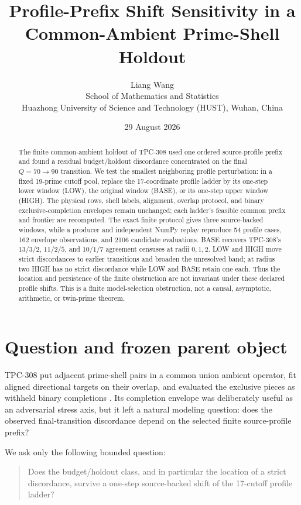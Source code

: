 \documentclass[11pt]{article}
\title{Profile-Prefix Shift Sensitivity in a\\
Common-Ambient Prime-Shell Holdout}
\author{Liang Wang\\
School of Mathematics and Statistics\\
Huazhong University of Science and Technology (HUST), Wuhan, China}
\date{29 August 2026}
\begin{document}
\maketitle

\begin{abstract}
The finite common-ambient holdout of TPC-308 used one ordered source-profile
prefix and found a residual budget/holdout discordance concentrated on the
final $Q=70\to90$ transition.  We test the smallest neighboring profile
perturbation: in a fixed 19-prime cutoff pool, replace the 17-coordinate
profile ladder by its one-step lower window (LOW), the original window (BASE),
or its one-step upper window (HIGH).  The physical rows, shell labels,
alignment, overlap protocol, and binary exclusive-completion envelopes remain
unchanged; each ladder's feasible common prefix and frontier are recomputed.
The exact finite protocol gives three source-backed windows, while a producer
and independent NumPy replay reproduce 54 profile cases, 162 envelope
observations, and 2106 candidate evaluations.  BASE recovers TPC-308's
$13/3/2$, $11/2/5$, and $10/1/7$ agreement censuses at radii $0,1,2$.
LOW and HIGH move strict discordances to earlier transitions and broaden the
unresolved band; at radius two HIGH has no strict discordance while LOW and
BASE retain one each.  Thus the location and persistence of the finite
obstruction are not invariant under these declared profile shifts.  This is a
finite model-selection obstruction, not a causal, asymptotic, arithmetic, or
twin-prime theorem.
\end{abstract}

\section{Question and frozen parent object}

TPC-308 put adjacent prime-shell pairs in a common union ambient operator,
fit aligned directional targets on their overlap, and evaluated the exclusive
pieces as withheld binary completions \cite{tpc307,tpc308}.  Its completion
envelope was deliberately useful as an adversarial stress axis, but it left a
natural modeling question: does the observed final-transition discordance
depend on the selected finite source-profile prefix?

We ask only the following bounded question:

\begin{quote}
Does the budget/holdout class, and in particular the location of a strict
discordance, survive a one-step source-backed shift of the 17-cutoff profile
ladder?
\end{quote}
\end{document}
